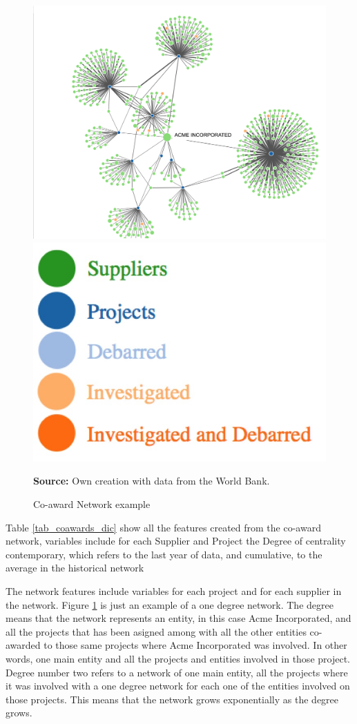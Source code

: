 \begin{figure}[H]
\begin{center}
\caption{Co-award Network example}
\label{fig_network}
\includegraphics[max width=.8\textwidth]{../img/Network-colors.png}
\includegraphics[max width=.19\textwidth]{../img/network-legend.jpg}
\end{center}
\noindent \footnotesize{\textbf{Source:} Own creation with data from the World Bank.}
\end{figure}

Table \ref{tab_coawards_dic} show all the features created from the co-award network, variables include for each Supplier and Project the Degree of centrality contemporary, which refers to the last year of data, and cumulative, to the average in the historical network




The network features include variables for each project and for each supplier in the network. Figure \ref{fig_network} is just an example of a one degree network. The degree means that the network represents an entity, in this case Acme Incorporated, and all the projects that has been asigned among with all the other entities co-awarded to those same projects where Acme Incorporated was involved. In other words, one main entity and all the projects and entities involved in those project. Degree number two refers to a network of one main entity, all the projects where it was involved with a one degree network for each one of the entities involved on those projects. This means that the network grows exponentially as the degree grows.

